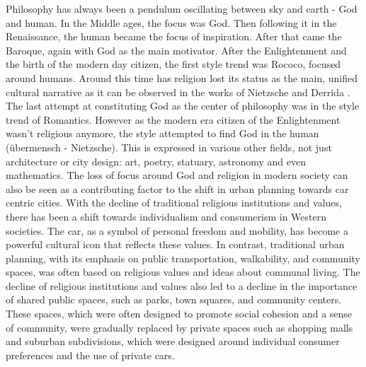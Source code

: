 \documentclass[
]{elteikthesis}[2023/04/10]
\begin{document}
Philosophy has always been a pendulum oscillating between sky and
earth - God and human. In the Middle ages, the focus was God. Then
following it in the Renaissance, the human became the focus of inspiration.
After that came the Baroque, again with God as the main motivator.
After the Enlightenment and the birth of the modern day citizen, the
first style trend was Rococo, focused around humans. Around this time
has religion lost its status as the main, unified cultural narrative
as it can be observed in the works of Nietzsche and Derrida \cite{williams2012tragedy}.
The last attempt at constituting God as the center of philosophy was
in the style trend of Romantics. However as the modern era citizen
of the Enlightenment wasn't religious anymore, the style attempted
to find God in the human (übermensch - Nietzsche). This is expressed
in various other fields, not just architecture or city design: art,
poetry, statuary, astronomy and even mathematics. The loss of focus
around God and religion in modern society can also be seen as a contributing
factor to the shift in urban planning towards car centric cities.
With the decline of traditional religious institutions and values,
there has been a shift towards individualism and consumerism in Western
societies. The car, as a symbol of personal freedom and mobility,
has become a powerful cultural icon that reflects these values. In
contrast, traditional urban planning, with its emphasis on public
transportation, walkability, and community spaces, was often based
on religious values and ideas about communal living. The decline of
religious institutions and values also led to a decline in the importance
of shared public spaces, such as parks, town squares, and community
centers. These spaces, which were often designed to promote social
cohesion and a sense of community, were gradually replaced by private
spaces such as shopping malls and suburban subdivisions, which were
designed around individual consumer preferences and the use of private
cars.
\end{document}
